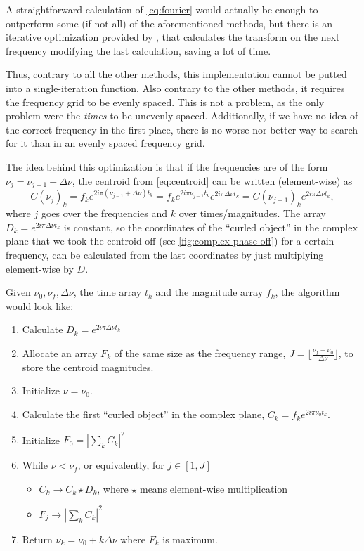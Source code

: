 A straightforward calculation of \autoref{eq:fourier} would actually be enough to outperform some (if not all) of the aforementioned methods,
but there is an iterative optimization provided by \cite{Kurtz1985}, that calculates the transform on the next frequency modifying the last calculation,
saving a lot of time.

Thus, contrary to all the other methods, this implementation cannot be putted into a single-iteration function.
Also contrary to the other methods, it requires the frequency grid to be evenly spaced. This is not a problem, 
as the only problem were the \textit{times} to be unevenly spaced.
Additionally, if we have no idea of the correct frequency in the first place, 
there is no worse nor better way to search for it than in an evenly spaced frequency grid.

The idea behind this optimization is that if the frequencies are of the form $\nu_j = \nu_{j-1} + \Delta \nu$, the centroid from \autoref{eq:centroid} 
can be written (element-wise) as
\begin{equation}
	C(\nu_j)_k = f_k e^{2i\pi (\nu_{j-1}+\Delta \nu) t_k} = f_k e^{2i\pi \nu_{j-1} t_k} e^{2i\pi \Delta \nu t_k} = C(\nu_{j-1})_k e^{2i\pi \Delta \nu t_k},
\end{equation}
where $j$ goes over the frequencies and $k$ over times/magnitudes. 
The array $D_k = e^{2i\pi \Delta \nu t_k}$ is constant, 
so the coordinates of the \enquote{curled object} in the complex plane that we took the centroid off (see \autoref{fig:complex-phase-off})
for a certain frequency, can be calculated from the last coordinates by just multiplying element-wise by $D$.

Given $\nu_0,\nu_f,\Delta \nu$, the time array $t_k$ and the magnitude array $f_k$, the algorithm would look like:

\begin{enumerate}
	\item Calculate $D_k = e^{2i\pi \Delta \nu t_k}$
	\item Allocate an array $F_k$ of the same size as the frequency range, $J=\lfloor \frac{\nu_f-\nu_0}{\Delta \nu} \rfloor$, to store the centroid magnitudes.
	\item Initialize $\nu=\nu_0$.
	\item Calculate the first \enquote{curled object} in the complex plane, $C_k = f_k e^{2i\pi \nu_0 t_k}$.
	\item Initialize $F_0 = \left|\sum_k C_k\right|^2$
	\item While $\nu<\nu_f$, or equivalently, for $j \in [1,J]$
	\begin{itemize}
		\item $C_k \to C_k \star D_k $, where $\star$ means element-wise multiplication
		\item $F_j \to \left|\sum_k C_k\right|^2$
	\end{itemize}
	\item Return $\nu_k = \nu_0 + k \Delta \nu$ where $F_k$ is maximum. 
\end{enumerate}

